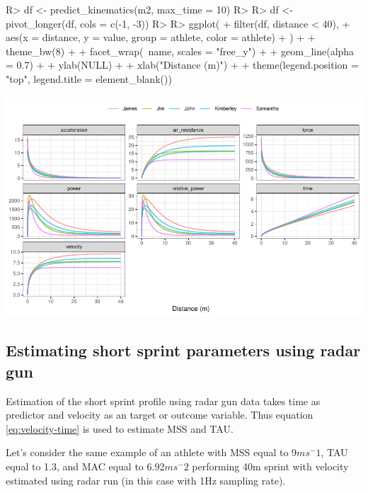 \documentclass[
]{jss}
\begin{document}
\begin{CodeChunk}
\begin{CodeInput}
R> df <- predict_kinematics(m2, max_time = 10)
R> 
R> df <- pivot_longer(df, cols = c(-1, -3))
R> 
R> ggplot(
+   filter(df, distance < 40),
+   aes(x = distance, y = value, group = athlete, color = athlete)
+ ) +
+   theme_bw(8) +
+   facet_wrap(~name, scales = "free_y") +
+   geom_line(alpha = 0.7) +
+   ylab(NULL) +
+   xlab("Distance (m)") +
+   theme(legend.position = "top", legend.title = element_blank())
\end{CodeInput}


\begin{center}\includegraphics[width=1\linewidth]{paper_files/figure-latex/unnamed-chunk-12-1} \end{center}

\end{CodeChunk}

\hypertarget{estimating-short-sprint-parameters-using-radar-gun}{%
\subsection{Estimating short sprint parameters using radar gun}\label{estimating-short-sprint-parameters-using-radar-gun}}

Estimation of the short sprint profile using radar gun data takes time as predictor and velocity as an target or outcome variable. Thus equation \eqref{eq:velocity-time} is used to estimate MSS and TAU.

Let's consider the same example of an athlete with MSS equal to 9\(ms^-1\), TAU equal to 1.3, and MAC equal to 6.92\(ms^-2\) performing 40m sprint with velocity estimated using radar run (in this case with 1Hz sampling rate).
\end{document}
